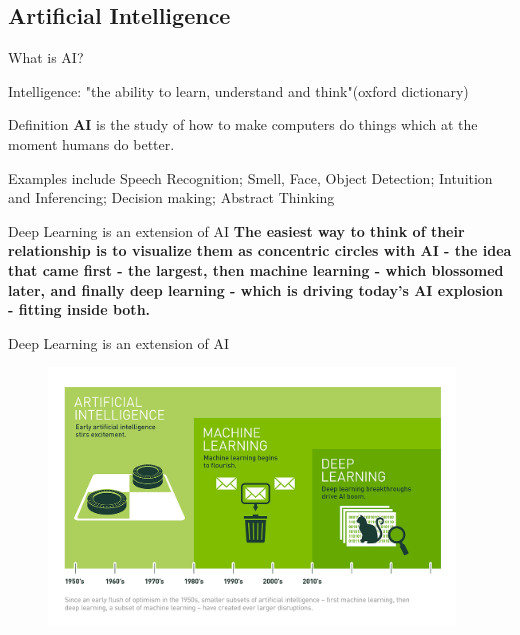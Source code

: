 \documentclass[10pt]{beamer}
\begin{document}
	\subsection{Artificial Intelligence}
	\begin{frame}{What is AI?}
		\begin{center}
			\alert{Intelligence:} "the ability to learn, understand and think"(oxford dictionary)
			\bigskip
			\begin{block}{Definition}
				\textbf{AI} is the study of how to make computers do things which at the moment humans do better.
			\end{block}
			\bigskip
			Examples include Speech Recognition; Smell, Face, Object Detection; Intuition and Inferencing; Decision making; Abstract Thinking
		\end{center} 
	\end{frame}
	\begin{frame}{Deep Learning is an extension of AI}
		\large{\textbf{The easiest way to think of their relationship is to visualize them as concentric circles with AI - the idea that came first - the largest, then machine learning - which blossomed later, and finally deep learning - which is driving today’s AI explosion - fitting inside both.}}
	\end{frame}
	\begin{frame}{Deep Learning is an extension of AI}
		\begin{figure}
			\includegraphics[width=\linewidth,height=2.7in]{images/ai}
		\end{figure}
	\end{frame}
	
\end{document}

